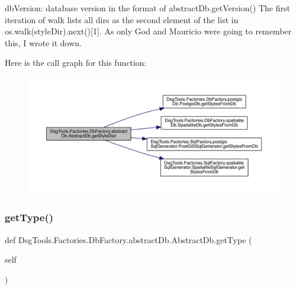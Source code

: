 \begin{DoxyVerb}dbVersion: database version in the format of abstractDb.getVersion()
The first iteration of walk lists all dirs as the second element of the list in os.walk(styleDir).next()[1]. 
As only God and Mauricio were going to remember this, I wrote it down.
\end{DoxyVerb}
 Here is the call graph for this function\+:
\nopagebreak
\begin{figure}[H]
\begin{center}
\leavevmode
\includegraphics[width=350pt]{class_dsg_tools_1_1_factories_1_1_db_factory_1_1abstract_db_1_1_abstract_db_acfeaf4a5658a8ec9aa3adcf74f8a2ab9_cgraph}
\end{center}
\end{figure}
\mbox{\label{class_dsg_tools_1_1_factories_1_1_db_factory_1_1abstract_db_1_1_abstract_db_a83c559974cbd912019bdde7a12656d32}} 
\subsubsection{\texorpdfstring{get\+Type()}{getType()}}
{\footnotesize\ttfamily def Dsg\+Tools.\+Factories.\+Db\+Factory.\+abstract\+Db.\+Abstract\+Db.\+get\+Type (\begin{DoxyParamCaption}\item[{}]{self }\end{DoxyParamCaption})}

